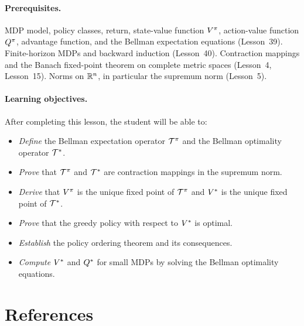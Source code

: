 \documentclass[11pt,a4paper]{article}
\begin{document}
\paragraph{Prerequisites.}
MDP model, policy classes, return, state-value function $V^{\pi}$,
action-value function $Q^{\pi}$, advantage function, and the Bellman
expectation equations (Lesson~39). Finite-horizon MDPs and backward
induction (Lesson~40). Contraction mappings and the Banach fixed-point
theorem on complete metric spaces (Lesson~4, Lesson~15). Norms on
$\mathbb{R}^n$, in particular the supremum norm (Lesson~5).

\paragraph{Learning objectives.}
After completing this lesson, the student will be able to:
\begin{itemize}
    \item \emph{Define} the Bellman expectation operator $\mathcal{T}^\pi$
    and the Bellman optimality operator $\mathcal{T}^*$.
    \item \emph{Prove} that $\mathcal{T}^\pi$ and $\mathcal{T}^*$ are
    contraction mappings in the supremum norm.
    \item \emph{Derive} that $V^{\pi}$ is the unique fixed point of
    $\mathcal{T}^\pi$ and $V^*$ is the unique fixed point of
    $\mathcal{T}^*$.
    \item \emph{Prove} that the greedy policy with respect to $V^*$
    is optimal.
    \item \emph{Establish} the policy ordering theorem and its
    consequences.
    \item \emph{Compute} $V^*$ and $Q^*$ for small MDPs by
    solving the Bellman optimality equations.
\end{itemize}


\section{References}
\label{sec:references}
\end{document}
